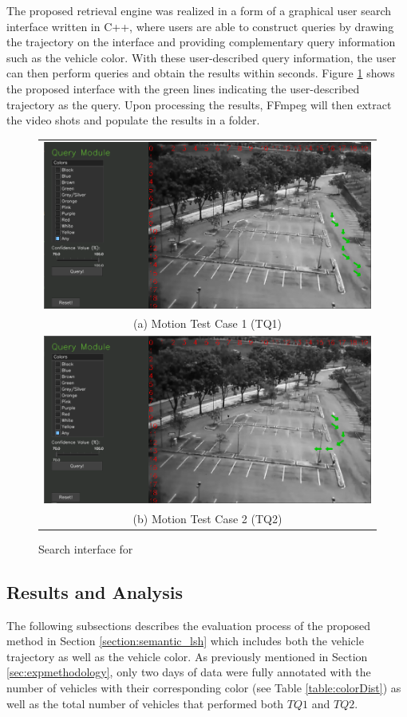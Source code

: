 The proposed retrieval engine was realized in a form of a graphical user search interface written in C++, where users are able to construct queries by drawing the trajectory on the interface and providing complementary query information such as the vehicle color. With these user-described query information, the user can then perform queries and obtain the results within seconds. Figure \ref{fig:versionOneInterface} shows the proposed interface with the green lines indicating the user-described trajectory as the query. Upon processing the results, FFmpeg will then extract the video shots and populate the results in a folder.





\begin{figure}[htb!]
	\centering
	\begin{tabular}{c}
		\includegraphics[width=0.7\linewidth]{image/retrievalOne/test1-8inputs.PNG} \\  
		(a) Motion Test Case 1 (TQ1) \\
		\includegraphics[width=0.7\linewidth]{image/retrievalOne/test2-6input.PNG}\\
		(b) Motion Test Case 2 (TQ2)
	\end{tabular}
	\caption{Search interface for \versionOne} 
	\label{fig:versionOneInterface}
\end{figure}




\subsection{Results and Analysis}
The following subsections describes the evaluation process of the proposed method in Section \ref{section:semantic_lsh} which includes both the vehicle trajectory as well as the vehicle color. As previously mentioned in Section \ref{sec:expmethodology}, only two days of data were fully annotated with the number of vehicles with their corresponding color (see Table \ref{table:colorDist}) as well as the total number of vehicles that performed both $TQ1$ and $TQ2$. 


